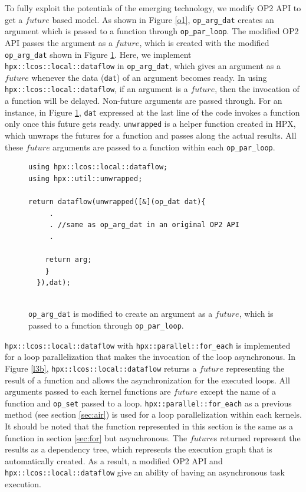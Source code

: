 \documentclass[conference]{IEEEtran}
\begin{document}
To fully exploit the potentials of the emerging technology, we modify OP2 API to get a $future$ based model. As shown in Figure \ref{o1}, \texttt{op\_arg\_dat} creates an argument which is passed to a function through \texttt{op\_par\_loop}. The modified OP2 API passes the argument as a $future$, which is created with the modified \texttt{op\_arg\_dat} shown in Figure \ref{o2}. Here, we implement \texttt{hpx::lcos::local::dataflow} in \texttt{op\_arg\_dat}, which gives an argument as a $future$ whenever the data (\texttt{dat}) of an argument becomes ready. In using \texttt{hpx::lcos::local::dataflow}, if an argument is a $future$, then the invocation of a function will be delayed. Non-future arguments are passed through. For an instance, in Figure \ref{o2}, \texttt{dat} expressed at the last line of the code invokes a function only once this future gets ready. \texttt{unwrapped} is a helper function created in HPX, which unwraps the futures for a function and passes along the actual results. All these $future$ arguments are passed to a function within each \texttt{op\_par\_loop}.

\begin{figure}
    \begin{lstlisting}    
using hpx::lcos::local::dataflow;
using hpx::util::unwrapped;    

return dataflow(unwrapped([&](op_dat dat){
     .
     . //same as op_arg_dat in an original OP2 API
     .

    return arg;
    }
  }),dat);
  
    \end{lstlisting}
    \caption{\small{\texttt{op\_arg\_dat} is modified to create an argument as a $future$, which is passed to a function through \texttt{op\_par\_loop}.}}
    \label{o2}
\end{figure}

\texttt{hpx::lcos::local::dataflow} with \texttt{hpx::parallel::for\_each} is implemented for a loop parallelization that makes the invocation of the loop asynchronous. In Figure \ref{l3b}, \texttt{hpx::lcos::local::dataflow} returns a $future$ representing the result of a function and allows the asynchronization for the executed loops. All arguments passed to each kernel functions are $future$ except the name of a function and \texttt{op\_set} passed to a loop. \texttt{hpx::parallel::for\_each} as a previous method (see section \ref{sec:air}) is used for a loop parallelization within each kernels. It should be noted that the function represented in this section is the same as a function in section \ref{sec:for} but asynchronous. The $future$s returned represent the results as a dependency tree, which represents the execution graph that is automatically created. As a result, a modified OP2 API and \texttt{hpx::lcos::local::dataflow} give an ability of having an asynchronous task execution. 
\end{document}
